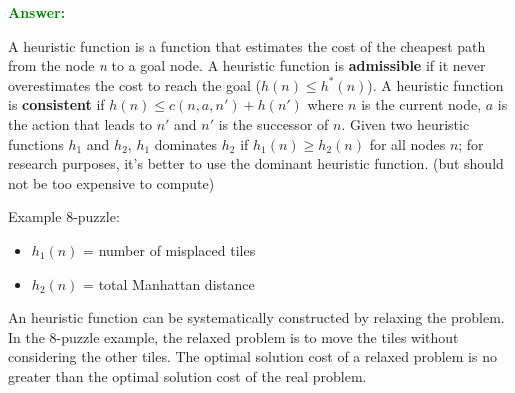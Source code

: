 \documentclass[12pt]{article}
\begin{document}
\begin{enumerate}[label=\textbf{IS.\arabic*}]
    \textcolor{green}{\textbf{Answer:}}

    A heuristic function is a function that estimates the cost of the cheapest path from the node \textit{n} to a goal node.
    A heuristic function is \textbf{admissible} if it never overestimates the cost to reach the goal ($h(n) \leq h^*(n)$).
    A heuristic function is \textbf{consistent} if $h(n) \leq c(n,a,n') + h(n')$ where $n$ is the current node, 
    $a$ is the action that leads to $n'$ and $n'$ is the successor of $n$.
    Given two heuristic functions $h_1$ and $h_2$, $h_1$ dominates $h_2$ if $h_1(n) \geq h_2(n)$ for all nodes $n$; for research purposes,
    it's better to use the dominant heuristic function. (but should not be too expensive to compute)

    Example 8-puzzle:
    \begin{itemize}
        \item $h_1(n)$ = number of misplaced tiles
        \item $h_2(n)$ = total Manhattan distance
    \end{itemize}

    An heuristic function can be systematically constructed by relaxing the problem.
    In the 8-puzzle example, the relaxed problem is to move the tiles without considering the other tiles.
    The optimal solution cost of a relaxed problem is no greater than the optimal solution cost of the real problem.
\end{enumerate}
\end{document}
